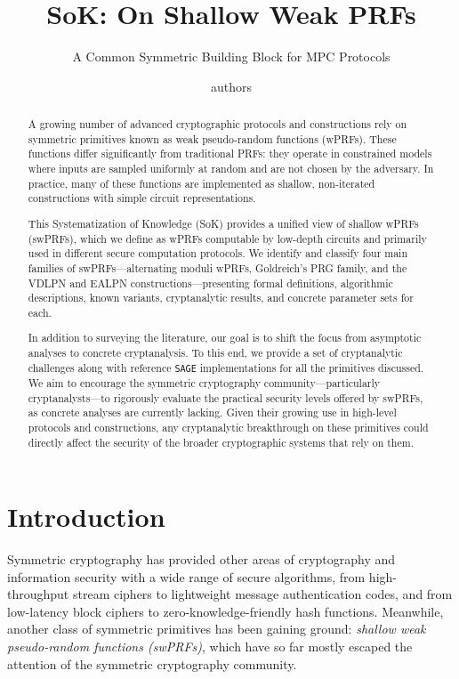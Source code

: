\documentclass[journal=tosc,submission]{iacrtrans}
\author{authors}
\institute{institutions}
\title{SoK: On Shallow Weak PRFs}
\subtitle{A Common Symmetric Building Block for MPC Protocols}
\theoremstyle{theorem}
\begin{document}
\maketitle

\begin{abstract}
A growing number of advanced cryptographic protocols and constructions rely on symmetric primitives known as weak pseudo-random functions (wPRFs). These functions differ significantly from traditional PRFs: they operate in constrained models where inputs are sampled uniformly at random and are not chosen by the adversary. In practice, many of these functions are implemented as shallow, non-iterated constructions with simple circuit representations.

This Systematization of Knowledge (SoK) provides a unified view of shallow wPRFs (swPRFs), which we define as wPRFs computable by low-depth circuits and primarily used in different secure computation protocols. We identify and classify four main families of swPRFs—alternating moduli wPRFs, Goldreich’s PRG family, and the {\sf VDLPN} and {\sf EALPN} constructions—presenting formal definitions, algorithmic descriptions, known variants, cryptanalytic results, and concrete parameter sets for each.

In addition to surveying the literature, our goal is to shift the focus from asymptotic analyses to concrete cryptanalysis. To this end, we provide a set of cryptanalytic challenges along with reference {\tt SAGE} implementations for all the primitives discussed.  We aim to encourage the symmetric cryptography community—particularly cryptanalysts—to rigorously evaluate the practical security levels offered by swPRFs, as concrete analyses are currently lacking. Given their growing use in high-level protocols and constructions, any cryptanalytic breakthrough on these primitives could directly affect the security of the broader cryptographic systems that rely on them.
\end{abstract}




\section{Introduction}
\label{sec:intro}

Symmetric cryptography has provided other areas of cryptography and information security with a wide range of secure algorithms, from high-throughput stream ciphers to lightweight message authentication codes, and from low-latency block ciphers to zero-knowledge-friendly hash functions. Meanwhile,  another class of symmetric primitives has been gaining ground: \emph{shallow weak pseudo-random functions (swPRFs)}, which have so far mostly escaped the attention of the symmetric cryptography community. 
\end{document}
